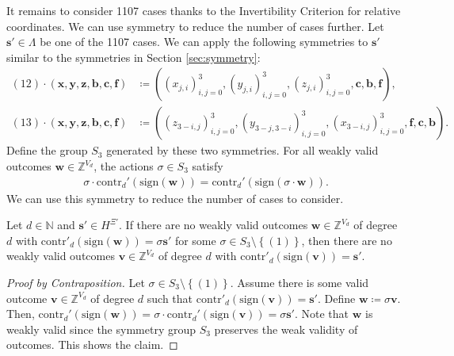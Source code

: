It remains to consider 1107 cases thanks to the Invertibility Criterion for relative coordinates. We can use symmetry to reduce the number of cases further. Let \( \mathbf{s}' \in \Lambda \) be one of the 1107 cases. We can apply the following symmetries to \( \mathbf{s}' \) similar to the symmetries in Section \ref{sec:symmetry}:
\begin{align*}
    (12) \cdot (\mathbf{x}, \mathbf{y}, \mathbf{z}, \mathbf{b}, \mathbf{c}, \mathbf{f}) &\coloneqq ((x_{j,i})_{i,j=0}^3, (y_{j,i})_{i,j=0}^3, (z_{j,i})_{i,j=0}^3, \mathbf{c}, \mathbf{b}, \mathbf{f}), \\
    (13) \cdot (\mathbf{x}, \mathbf{y}, \mathbf{z}, \mathbf{b}, \mathbf{c}, \mathbf{f}) &\coloneqq ((z_{3-i,j})_{i,j=0}^3, (y_{3-j,3-i})_{i,j=0}^3, (x_{3-i,j})_{i,j=0}^3, \mathbf{f}, \mathbf{c}, \mathbf{b}).
\end{align*}
Define the group \( S_3 \) generated by these two symmetries. For all weakly valid outcomes \( \mathbf{w} \in \mathbb{Z}^{V_d} \), the actions \( \sigma \in S_3 \) satisfy 
\begin{align*}
    \sigma \cdot \mathrm{contr}_d'(\mathrm{sign}(\mathbf{w})) = \mathrm{contr}_d'(\mathrm{sign}(\sigma \cdot \mathbf{w})).
\end{align*}
We can use this symmetry to reduce the number of cases to consider.

\begin{proposition}
    Let \( d \in \mathbb{N} \) and \( \mathbf{s}' \in H^{\Xi'} \). If there are no weakly valid outcomes \( \mathbf{w} \in \mathbb{Z}^{V_d} \) of degree \( d \) with \( \mathrm{contr}'_{d}(\mathrm{sign}(\mathbf{w})) = \sigma \mathbf{s}' \) for some \( \sigma \in S_3 \setminus \left\{ (1) \right\} \), then there are no weakly valid outcomes \( \mathbf{v} \in \mathbb{Z}^{V_d} \) of degree \( d \) with \( \mathrm{contr}'_{d}(\mathrm{sign}(\mathbf{v})) = \mathbf{s}' \).
\end{proposition}

\begin{proof}[Proof by Contraposition]
    Let \( \sigma \in S_3 \setminus \left\{ (1) \right\} \).
    Assume there is some valid outcome \( \mathbf{v} \in \mathbb{Z}^{V_d} \) of degree \( d \) such that \( \mathrm{contr}'_d(\mathrm{sign}(\mathbf{v})) = \mathbf{s}' \). Define \( \mathbf{w} \coloneqq \sigma \mathbf{v} \). Then, \( \mathrm{contr}_d'(\mathrm{sign}( \mathbf{w})) =  \sigma \cdot \mathrm{contr}_d'(\mathrm{sign}(\mathbf{v}))  = \sigma \mathbf{s}'\). Note that \( \mathbf{w} \) is weakly valid since the symmetry group \( S_3 \) preserves the weak validity of outcomes. This shows the claim.
\end{proof}

